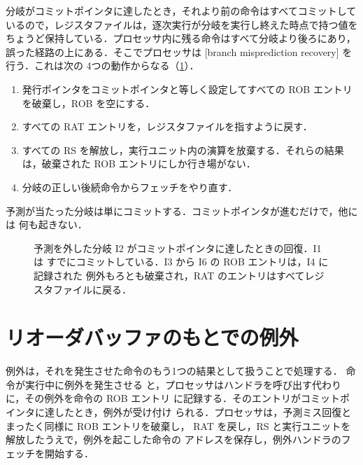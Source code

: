 \documentclass[../main.tex]{subfiles}
\begin{document}
分岐がコミットポインタに達したとき，それより前の命令はすべてコミットして
いるので，レジスタファイルは，逐次実行が分岐を実行し終えた時点で持つ値を
ちょうど保持している．プロセッサ内に残る命令はすべて分岐より後ろにあり，
誤った経路の上にある．そこでプロセッサは
[branch misprediction recovery]%
を行う．これは次の 4つの動作からなる（\cref{fig:l08-recovery}）．
\begin{enumerate}
  \item 発行ポインタをコミットポインタと等しく設定してすべての ROB
    エントリを破棄し，ROB を空にする．
  \item すべての RAT エントリを，レジスタファイルを指すように戻す．
  \item すべての RS を解放し，実行ユニット内の演算を放棄する．それらの結果
    は，破棄された ROB エントリにしか行き場がない．
  \item 分岐の正しい後続命令からフェッチをやり直す．
\end{enumerate}
予測が当たった分岐は単にコミットする．コミットポインタが進むだけで，他には
何も起きない．

\begin{figure}[htbp]
  \centering
  
  \caption{予測を外した分岐 I2 がコミットポインタに達したときの回復．I1 は
    すでにコミットしている．I3 から I6 の ROB エントリは，I4 に記録された
    例外もろとも破棄され，RAT のエントリはすべてレジスタファイルに戻る．}
  \label{fig:l08-recovery}
\end{figure}

\section{リオーダバッファのもとでの例外}
\label{sec:l08-rob-exceptions}

例外は，それを発生させた命令のもう1つの結果として扱うことで処理する．
命令が実行中に例外を発生させる
と，プロセッサはハンドラを呼び出す代わりに，その例外を命令の ROB エントリ
に記録する．そのエントリがコミットポインタに達したとき，例外が受け付け
られる．プロセッサは，予測ミス回復とまったく同様に ROB エントリを破棄し，
RAT を戻し，RS と実行ユニットを解放したうえで，例外を起こした命令の
アドレスを保存し，例外ハンドラのフェッチを開始する．
\end{document}
